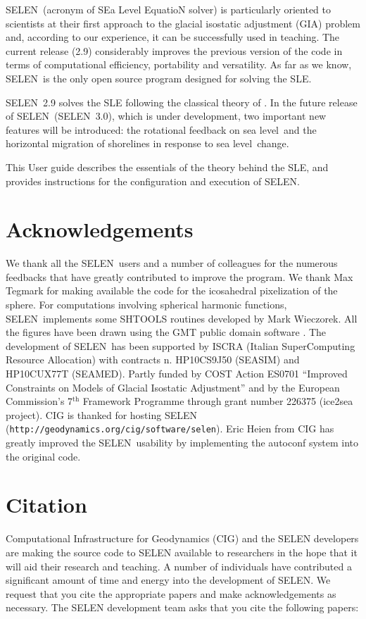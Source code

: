 \documentclass[11pt,fleqn,a4paper,titlepage]{article}
\newcommand\selen{\textsf{SELEN~}}
\newcommand\selens{\textsf{SELEN}}
\newcommand\sealevel{sea level~}
\begin{document}
\selen (acronym of SEa Level EquatioN solver) is particularly oriented to scientists at their first approach to the glacial isostatic adjustment (GIA) problem and, according to our experience, it can be successfully used in teaching. The current release (2.9) considerably improves the previous version of the code in terms of computational efficiency, portability and versatility. As far as we know, 
\selen is the only open source program designed for solving the SLE. 

\selen 2.9 solves the SLE following the classical theory of \citet{Farrell_and_Clark_1976}. In the future release of \selen (\selen 3.0), which is under development, two important new features will be introduced: the rotational feedback on \sealevel and the horizontal migration of shorelines in response to \sealevel change. 

This User guide describes the essentials of the theory behind the SLE, and provides instructions for the configuration and execution of \selens. 

\section{Acknowledgements}
We thank all the \selen users and a number of colleagues for the numerous feedbacks that have greatly contributed to improve the program. We thank Max Tegmark for making available the code for the icosahedral pixelization of the sphere. For computations involving spherical harmonic functions, \selen implements some {SHTOOLS} routines developed by Mark Wieczorek. All the figures have been drawn using the GMT public domain software \citep{Wessel_and_Smith_1998}. The development of \selen has been supported by ISCRA (Italian SuperComputing Resource Allocation) with contracts n. HP10CS9J50 (SEASIM) and HP10CUX77T (SEAMED). Partly funded by COST Action ES0701 ``Improved Constraints on Models of Glacial Isostatic Adjustment'' and by the European Commission's 7$^{\textrm{th}}$ Framework Programme through grant number 226375 (ice2sea project). CIG is thanked for hosting SELEN (\texttt{http://geodynamics.org/cig/software/selen}). Eric Heien from CIG has greatly improved the \selen usability by implementing the autoconf system into the original code.

\section{Citation}
Computational Infrastructure for Geodynamics (CIG) and the SELEN developers are making the source code to SELEN available to researchers in the hope that it will aid their research and teaching.  A number of individuals have contributed a significant amount of time and energy into the development of SELEN.  We request that you cite the appropriate papers and make acknowledgements as necessary. The SELEN development team asks that you cite the following papers:
\end{document}
